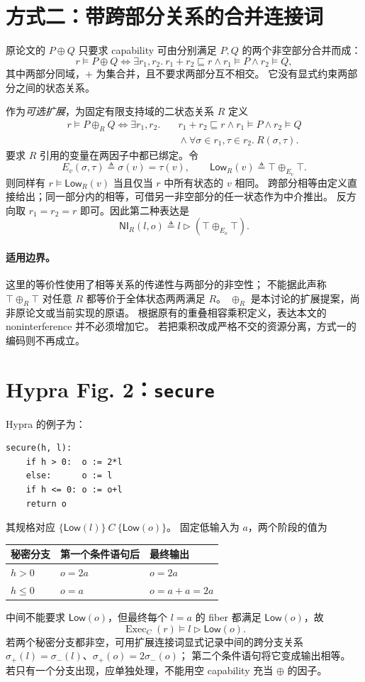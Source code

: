 \documentclass[UTF8,a4paper,11pt,fontset=fandol]{ctexart}
\newcommand{\Low}{\mathsf{Low}}
\newcommand{\NI}{\mathsf{NI}}
\newcommand{\Exec}{\operatorname{Exec}}
\newcommand{\sat}{\models}
\newcommand{\eqv}{\Longleftrightarrow}
\begin{document}
\section{方式二：带跨部分关系的合并连接词}

原论文的 $P\oplus Q$ 只要求 capability 可由分别满足 $P,Q$ 的两个非空部分合并而成：
\[
 r\sat P\oplus Q\eqv
 \exists r_1,r_2.\ r_1+r_2\sqsubseteq r\land r_1\sat P\land r_2\sat Q,
\]
其中两部分同域，$+$ 为集合并，且不要求两部分互不相交。
它没有显式约束两部分之间的状态关系。

作为\emph{可选扩展}，为固定有限支持域的二状态关系 $R$ 定义
\begin{align*}
 r\sat P\oplus_R Q\eqv\exists r_1,r_2.\quad
 &r_1+r_2\sqsubseteq r\land r_1\sat P\land r_2\sat Q\\
 &{}\land\forall\sigma\in r_1,\tau\in r_2.\ R(\sigma,\tau).
\end{align*}
要求 $R$ 引用的变量在两因子中都已绑定。令
\[
 E_v(\sigma,\tau)\triangleq\sigma(v)=\tau(v),\qquad
 \Low_R(v)\triangleq\top\oplus_{E_v}\top.
\]
则同样有 $r\sat\Low_R(v)$ 当且仅当 $r$ 中所有状态的 $v$ 相同。
跨部分相等由定义直接给出；同一部分内的相等，可借另一非空部分的任一状态作为中介推出。
反方向取 $r_1=r_2=r$ 即可。因此第二种表达是
\[
 \boxed{\NI_R(l,o)\triangleq l\triangleright(\top\oplus_{E_o}\top).}
\]

\paragraph{适用边界。}
这里的等价性使用了相等关系的传递性与两部分的非空性；
不能据此声称 $\top\oplus_R\top$ 对任意 $R$ 都等价于全体状态两两满足 $R$。
$\oplus_R$ 是本讨论的扩展提案，尚非原论文或当前实现的原语。
根据原有的重叠相容乘积定义，表达本文的 noninterference 并不必须增加它。
若把乘积改成严格不交的资源分离，方式一的编码则不再成立。

\section{Hypra Fig. 2：\texttt{secure}}

Hypra\cite{hypra} 的例子为：
\begin{verbatim}
secure(h, l):
    if h > 0:  o := 2*l
    else:      o := l
    if h <= 0: o := o+l
    return o
\end{verbatim}
其规格对应 $\{\Low(l)\}\ C\ \{\Low(o)\}$。
固定低输入为 $a$，两个阶段的值为
\begin{center}
\begin{tabular}{lll}
\toprule
秘密分支 & 第一个条件语句后 & 最终输出\\
\midrule
$h>0$ & $o=2a$ & $o=2a$\\
$h\le0$ & $o=a$ & $o=a+a=2a$\\
\bottomrule
\end{tabular}
\end{center}
中间不能要求 $\Low(o)$，但最终每个 $l=a$ 的 fiber 都满足 $\Low(o)$，故
\[
 \Exec_C(r)\sat l\triangleright\Low(o).
\]
若两个秘密分支都非空，可用扩展连接词显式记录中间的跨分支关系
$\sigma_+(l)=\sigma_-(l)$、$\sigma_+(o)=2\sigma_-(o)$；
第二个条件语句将它变成输出相等。
若只有一个分支出现，应单独处理，不能用空 capability 充当 $\oplus$ 的因子。
\end{document}
